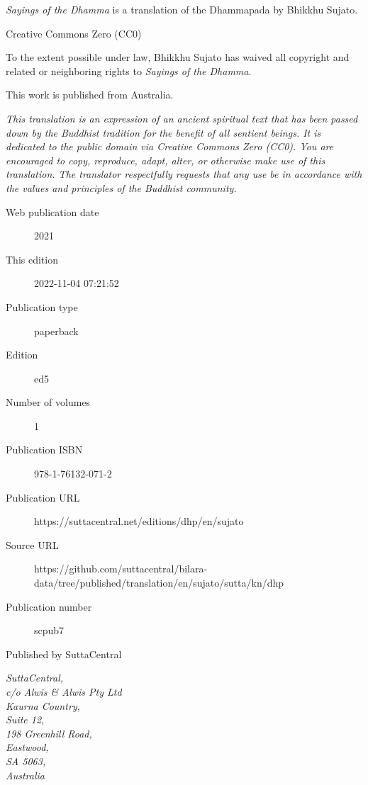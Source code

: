 \documentclass[12pt,openany]{book}%
\begin{document}
\begin{footnotesize}

\textit{Sayings of the Dhamma} is a translation of the Dhammapada by Bhikkhu Sujato.

\medskip

Creative Commons Zero (CC0)

To the extent possible under law, Bhikkhu Sujato has waived all copyright and related or neighboring rights to \textit{Sayings of the Dhamma}.

\medskip

This work is published from Australia.

\begin{center}
\textit{This translation is an expression of an ancient spiritual text that has been passed down by the Buddhist tradition for the benefit of all sentient beings. It is dedicated to the public domain via Creative Commons Zero (CC0). You are encouraged to copy, reproduce, adapt, alter, or otherwise make use of this translation. The translator respectfully requests that any use be in accordance with the values and principles of the Buddhist community.}
\end{center}

\medskip

\begin{description}
    \item[Web publication date] 2021
    \item[This edition] 2022-11-04 07:21:52
    \item[Publication type] paperback
    \item[Edition] ed5
    \item[Number of volumes] 1
    \item[Publication ISBN] 978-1-76132-071-2
    \item[Publication URL] https://suttacentral.net/editions/dhp/en/sujato
    \item[Source URL] https://github.com/suttacentral/bilara-data/tree/published/translation/en/sujato/sutta/kn/dhp
    \item[Publication number] scpub7
\end{description}

\medskip

Published by SuttaCentral

\medskip

\textit{SuttaCentral,\\
c/o Alwis \& Alwis Pty Ltd\\
Kaurna Country,\\
Suite 12,\\
198 Greenhill Road,\\
Eastwood,\\
SA 5063,\\
Australia}

\end{footnotesize}
\end{document}
